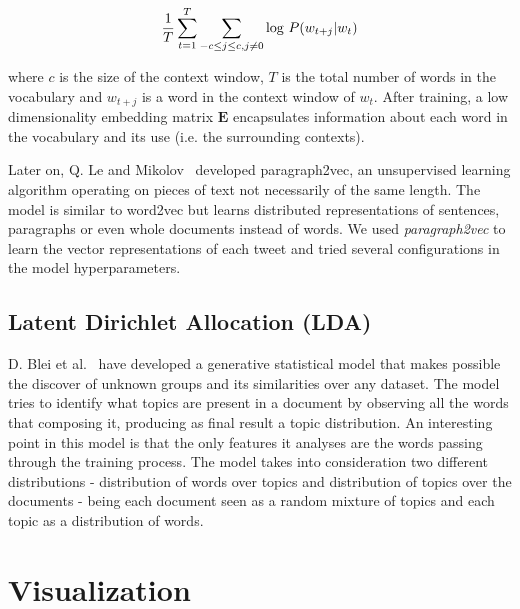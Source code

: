 \begin{equation}
\frac{1}{T}  \sum_{t=1}^{T}  \sum_{-c \leq j \leq  c, j \neq 0} \textnormal{log } P(w_{t+j} | w_t)
\end{equation}

where $c$ is the size of the context window, $T$ is the total number of words in the vocabulary and $w_{t+j}$ is a word in the context window of $w_t$. After training, a low dimensionality embedding matrix $\textbf{E}$ encapsulates information about each word in the vocabulary and its use (i.e. the surrounding contexts).

Later on, Q. Le and Mikolov~\cite{le2014distributed} developed paragraph2vec, an unsupervised learning algorithm operating on pieces of text not necessarily of the same length. The model is similar to word2vec but learns distributed representations of sentences, paragraphs or even whole documents instead of words. We used \emph{paragraph2vec} to learn the vector representations of each tweet and tried several configurations in the model hyperparameters.

\subsection{Latent Dirichlet Allocation (LDA)}
D. Blei et al.~\cite{blei2003latent} have developed a generative statistical model that makes possible the discover of unknown groups and its similarities over any dataset. The model tries to identify what topics are present in a document by observing all the words that composing it, producing as final result a topic distribution. An interesting point in this model is that the only features it analyses are the words passing through the training process. The model takes into consideration two different distributions - distribution of words over topics and distribution of topics over the documents - being each document seen as a random mixture of topics and each topic as a distribution of words.

\section{Visualization}\label{sec:visualization}

